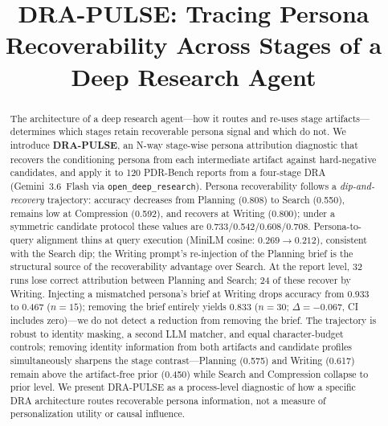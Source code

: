 \documentclass[]{article}
\title{DRA-PULSE: Tracing Persona Recoverability Across Stages of a
Deep Research Agent}
\begin{document}
\maketitle

\begin{abstract}
The architecture of a deep research agent---how it routes and re-uses stage artifacts---determines which stages retain recoverable persona signal and which do not.
We introduce \textbf{DRA-PULSE}, an N-way stage-wise persona attribution diagnostic that recovers the conditioning persona from each intermediate artifact against hard-negative candidates, and apply it to 120 PDR-Bench reports from a four-stage DRA (Gemini~3.6~Flash via \texttt{open\_deep\_research}).
Persona recoverability follows a \emph{dip-and-recovery} trajectory: accuracy decreases from Planning (0.808) to Search (0.550), remains low at Compression (0.592), and recovers at Writing (0.800); under a symmetric candidate protocol these values are 0.733/0.542/0.608/0.708.
Persona-to-query alignment thins at query execution (MiniLM cosine: $0.269 \to 0.212$), consistent with the Search dip; the Writing prompt's re-injection of the Planning brief is the structural source of the recoverability advantage over Search.
At the report level, 32 runs lose correct attribution between Planning and Search; 24 of these recover by Writing.
Injecting a mismatched persona's brief at Writing drops accuracy from 0.933 to 0.467 ($n{=}15$); removing the brief entirely yields 0.833 ($n{=}30$; $\Delta{=}{-}0.067$, CI includes zero)---we do not detect a reduction from removing the brief.
The trajectory is robust to identity masking, a second LLM matcher, and equal character-budget controls; removing identity information from both artifacts and candidate profiles simultaneously sharpens the stage contrast---Planning (0.575) and Writing (0.617) remain above the artifact-free prior (0.450) while Search and Compression collapse to prior level.
We present DRA-PULSE as a process-level diagnostic of how a specific DRA architecture routes recoverable persona information, not a measure of personalization utility or causal influence.
\end{abstract}

\end{document}
